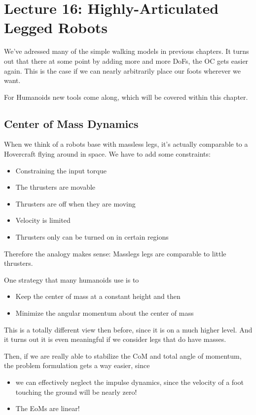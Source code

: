 \chapter{Lecture 16: Highly-Articulated Legged Robots}
We've adressed many of the simple walking models in previous chapters. It turns out that there at some point by adding more and more DoFs, the OC gets easier again. This is the case if we can nearly arbitrarily place our foots wherever we want.

For Humanoids new tools come along, which will be covered within this chapter. 


\section{Center of Mass Dynamics}
When we think of a robots base with massless legs, it's actually comparable to a Hovercraft flying around in space. We have to add some constraints: 
\begin{itemize}
\item Constraining the input torque
\item The thrusters are movable
\item Thrusters are off when they are moving
\item Velocity is limited
\item Thrusters only can be turned on in certain regions
\end{itemize} 
Therefore the analogy makes sense: Masslegs legs are comparable to little thrusters.

One strategy that many humanoids use is to
\begin{itemize}
\item Keep the center of mass at a constant height and then
\item Minimize the angular momentum about the center of mass
\end{itemize}
This is a totally different view then before, since it is on a much higher level. And it turns out it is even meaningful if we consider legs that do have masses. 

Then, if we are really able to stabilize the CoM and total angle of momentum, the problem formulation gets a way easier, since
\begin{itemize}
\item we can effectively neglect the impulse dynamics, since the velocity of a foot touching the ground will be nearly zero!
\item The EoMs are linear!
\end{itemize}
 

